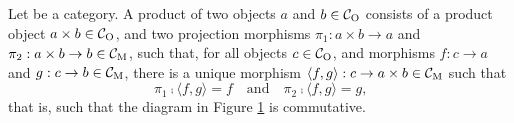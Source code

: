 \begin{definition}
  \label{def:product}


  Let  be a category. A product of two objects $a$ and $b \in
  \mathcal{C}_{\operatorname{O}}$ consists of a product object $a \times b \in \mathcal{C}_{\operatorname{O}}$,
  and two projection morphisms $\pi_{1}: a \times b \to a$ and
  $\pi_{2}: a \times b \to b \in \mathcal{C}_{\operatorname{M}}$, such that, for all objects
  $c \in \mathcal{C}_{\operatorname{O}}$, and morphisms $f: c \to a$ and $g: c \to b \in
  \mathcal{C}_{\operatorname{M}}$, there is a unique morphism $\langle{f,g}\rangle: c \to a
  \times b \in \mathcal{C}_{\operatorname{M}}$ such that
  \begin{equation}
    \label{eq:product}
    \pi_{1} \comp \langle{f,g}\rangle = f
    \quad
    \text{and}
    \quad
    \pi_{2} \comp \langle{f,g}\rangle = g
    \text{,}
  \end{equation}
  that is, such that the diagram in Figure \ref{fig:product} is
  commutative.
  \begin{figure}[htbp]
    \begin{center}
    \end{center}
    \caption{}
    \label{fig:product}
  \end{figure}

\end{definition}

